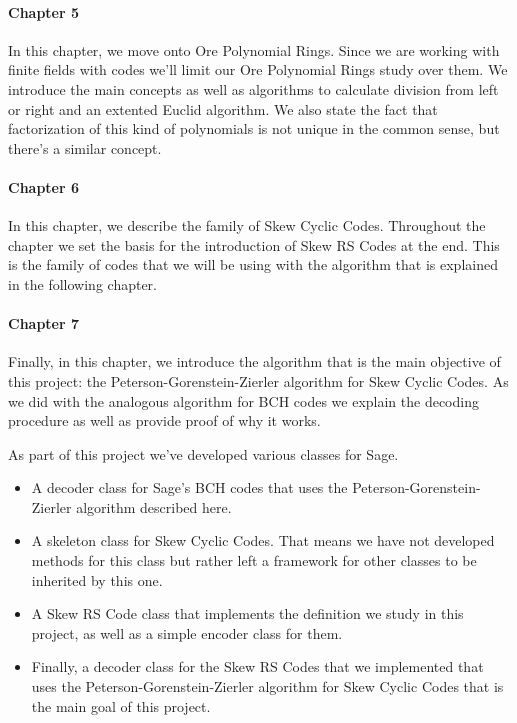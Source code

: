\paragraph{Chapter 5} In this chapter, we move onto Ore Polynomial Rings.
Since we are working with finite fields with codes we'll limit our Ore Polynomial Rings study over them.
We introduce the main concepts as well as algorithms to calculate division from left or right and an extented Euclid algorithm.
We also state the fact that factorization of this kind of polynomials is not unique in the common sense, but there's a similar concept.

\paragraph{Chapter 6} In this chapter, we describe the family of Skew Cyclic Codes.
Throughout the chapter we set the basis for the introduction of Skew RS Codes at the end.
This is the family of codes that we will be using with the algorithm that is explained in the following chapter.

\paragraph{Chapter 7} Finally, in this chapter, we introduce the algorithm that is the main objective of this project: the Peterson-Gorenstein-Zierler algorithm for Skew Cyclic Codes.
As we did with the analogous algorithm for BCH codes we explain the decoding procedure as well as provide proof of why it works.

As part of this project we've developed various classes for Sage.
\begin{itemize}
  \item A decoder class for Sage's BCH codes that uses the Peterson-Gorenstein-Zierler algorithm described here.
  \item A skeleton class for Skew Cyclic Codes. That means we have not developed methods for this class but rather left a framework for other classes to be inherited by this one.
  \item A Skew RS Code class that implements the definition we study in this project, as well as a simple encoder class for them.
  \item Finally, a decoder class for the Skew RS Codes that we implemented that uses the Peterson-Gorenstein-Zierler algorithm for Skew Cyclic Codes that is the main goal of this project.
\end{itemize}

